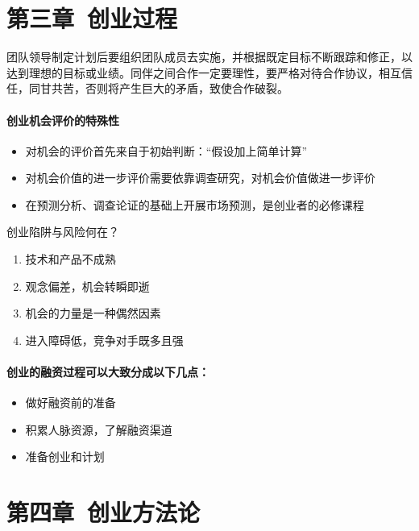 \documentclass[UTF8]{article}
\begin{document}
\section{第三章\ 创业过程}
团队领导制定计划后要组织团队成员去实施，并根据既定目标不断跟踪和修正，以达到理想的目标或业绩。同伴之间合作一定要理性，要严格对待合作协议，相互信任，同甘共苦，否则将产生巨大的矛盾，致使合作破裂。
\paragraph{创业机会评价的特殊性}
\begin{itemize}
    \item 对机会的评价首先来自于初始判断：“假设加上简单计算”
    \item	对机会价值的进一步评价需要依靠调查研究，对机会价值做进一步评价
    \item	在预测分析、调查论证的基础上开展市场预测，是创业者的必修课程
\end{itemize}
创业陷阱与风险何在？
\begin{enumerate}[1)]
\item 技术和产品不成熟
\item 观念偏差，机会转瞬即逝
\item 机会的力量是一种偶然因素
\item 进入障碍低，竞争对手既多且强
\end{enumerate}
\paragraph{创业的融资过程可以大致分成以下几点：}
\begin{itemize}
\item 做好融资前的准备
\item 积累人脉资源，了解融资渠道
\item 准备创业和计划
\end{itemize}

\section{第四章\ 创业方法论}
\end{document}
